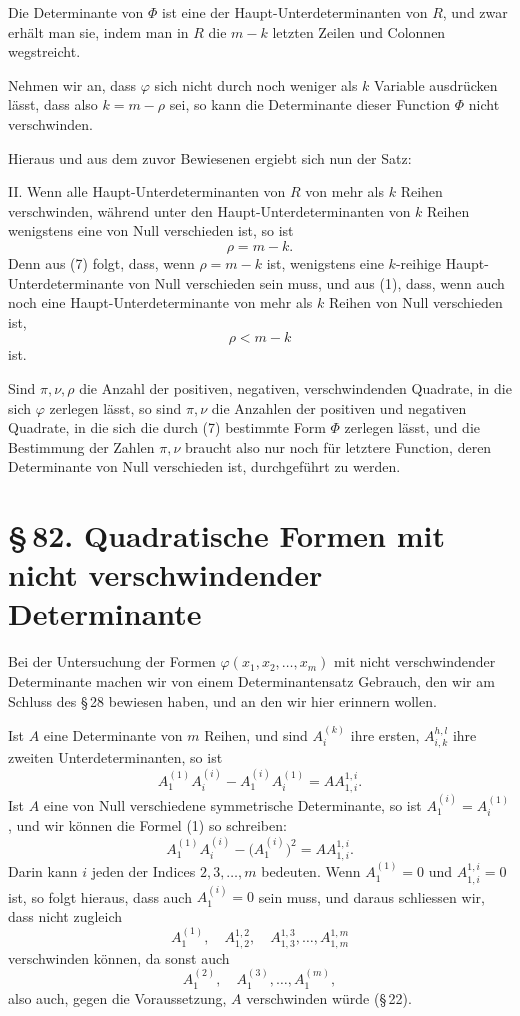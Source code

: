 \documentclass[11pt]{article}
\providecommand{\sect}[2]{\section*{\S\,#1. #2}}
\begin{document}
Die Determinante von $\Phi$ ist eine der Haupt-Unterdeterminanten von $R$, und zwar erh\"alt man sie, indem man in $R$ die $m-k$ letzten Zeilen und Colonnen wegstreicht.

Nehmen wir an, dass $\varphi$ sich nicht durch noch weniger als $k$ Variable ausdr\"ucken l\"asst, dass also $k=m-\rho$ sei, so kann die Determinante dieser Function $\Phi$ nicht verschwinden.

Hieraus und aus dem zuvor Bewiesenen ergiebt sich nun der Satz:

II. Wenn alle Haupt-Unterdeterminanten von $R$ von mehr als $k$ Reihen verschwinden, w\"ahrend unter den Haupt-Unterdeterminanten von $k$ Reihen wenigstens eine von Null verschieden ist, so ist
\[
        \rho=m-k.
\]
Denn aus (7) folgt, dass, wenn $\rho=m-k$ ist, wenigstens eine $k$-reihige Haupt-Unterdeterminante von Null verschieden sein muss, und aus (1), dass, wenn auch noch eine Haupt-Unterdeterminante von mehr als $k$ Reihen von Null verschieden ist,
\[
        \rho<m-k
\]
ist.

Sind $\pi,\nu,\rho$ die Anzahl der positiven, negativen, verschwindenden Quadrate, in die sich $\varphi$ zerlegen l\"asst, so sind $\pi,\nu$ die Anzahlen der positiven und negativen Quadrate, in die sich die durch (7) bestimmte Form $\Phi$ zerlegen l\"asst, und die Bestimmung der Zahlen $\pi,\nu$ braucht also nur noch f\"ur letztere Function, deren Determinante von Null verschieden ist, durchgef\"uhrt zu werden.

\sect{82}{Quadratische Formen mit nicht verschwindender Determinante}

Bei der Untersuchung der Formen $\varphi(x_1,x_2,\ldots,x_m)$ mit nicht verschwindender Determinante machen wir von einem Determinantensatz Gebrauch, den wir am Schluss des \S\,28 bewiesen haben, und an den wir hier erinnern wollen.

Ist $A$ eine Determinante von $m$ Reihen, und sind $A_i^{(k)}$ ihre ersten, $A_{i,k}^{h,l}$ ihre zweiten Unterdeterminanten, so ist
\begin{equation}
        A_1^{(1)}A_i^{(i)}-A_1^{(i)}A_i^{(1)}=A A_{1,i}^{1,i}.
\tag{1}
\end{equation}
Ist $A$ eine von Null verschiedene symmetrische Determinante, so ist $A_1^{(i)}=A_i^{(1)}$, und wir k\"onnen die Formel (1) so schreiben:
\begin{equation}
        A_1^{(1)}A_i^{(i)}-\bigl(A_1^{(i)}\bigr)^2=A A_{1,i}^{1,i}.
\tag{2}
\end{equation}
Darin kann $i$ jeden der Indices $2,3,\ldots,m$ bedeuten. Wenn $A_1^{(1)}=0$ und $A_{1,i}^{1,i}=0$ ist, so folgt hieraus, dass auch $A_1^{(i)}=0$ sein muss, und daraus schliessen wir, dass nicht zugleich
\[
        A_1^{(1)},\quad A_{1,2}^{1,2},\quad A_{1,3}^{1,3},\ldots, A_{1,m}^{1,m}
\]
verschwinden k\"onnen, da sonst auch
\[
        A_1^{(2)},\quad A_1^{(3)},\ldots,A_1^{(m)},
\]
also auch, gegen die Voraussetzung, $A$ verschwinden w\"urde (\S\,22).
\end{document}
